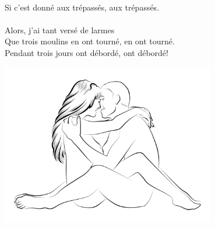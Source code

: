 \\
{Si c’est donné aux trépassés, aux trépassés.}
\\\\Alors, j'ai tant versé de larmes
\\Que trois moulins en ont tourné, en ont tourné.
\\
{Pendant trois jours ont débordé, ont débordé!}
\bigskip
\begin{center}
\includegraphics[width=0.7\textwidth]{images/brev72.png}
\end{center}

\breakpage
